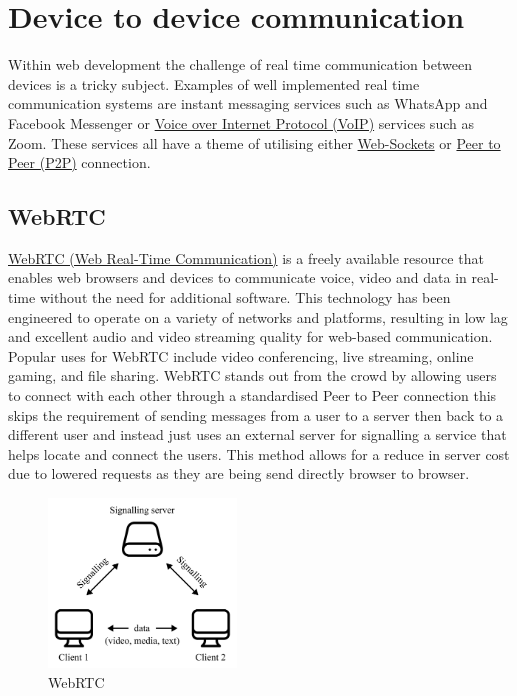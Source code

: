 \documentclass{l4proj}
\begin{document}
\section{Device to device communication}

Within web development the challenge of real time communication between devices is a tricky subject. Examples of well implemented real time communication systems are instant messaging services such as WhatsApp and Facebook Messenger or \href{https://developer.mozilla.org/en-US/docs/Glossary/VoIP}{Voice over Internet Protocol (VoIP)} services such as Zoom. These services all have a theme of utilising either \href{https://developer.mozilla.org/en-US/docs/Web/API/WebSocket}{Web-Sockets} or \href{https://developer.mozilla.org/en-US/docs/Glossary/P2P}{Peer to Peer (P2P)} connection.

\subsection{WebRTC}
\href{https://developer.mozilla.org/en-US/docs/Web/API/WebRTC_API}{WebRTC (Web Real-Time Communication)} \text is a freely available resource that enables web browsers and devices to communicate voice, video and data in real-time without the need for additional software. This technology has been engineered to operate on a variety of networks and platforms, resulting in low lag and excellent audio and video streaming quality for web-based communication. Popular uses for WebRTC include video conferencing, live streaming, online gaming, and file sharing. WebRTC stands out from the crowd by allowing users to connect with each other through a standardised Peer to Peer connection this skips the requirement of sending messages from a user to a server then back to a different user and instead just uses an external server for signalling a service that helps locate and connect the users. This method allows for a reduce in server cost due to lowered requests as they are being send directly browser to browser.

\begin{figure}[!ht]
    \centering
    \includegraphics[width=5cm]{dissertation/images/web-rtc-diagram.png}
    \caption{WebRTC}
    \label{fig:webRTC}
\end{figure}
\end{document}
